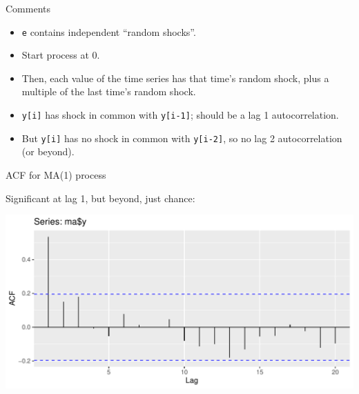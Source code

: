 \documentclass[ignorenonframetext,]{beamer}
\newenvironment{Shaded}{\begin{snugshade}}{\end{snugshade}}
\newcommand{\DataTypeTok}[1]{\textcolor[rgb]{0.13,0.29,0.53}{#1}}
\newcommand{\KeywordTok}[1]{\textcolor[rgb]{0.13,0.29,0.53}{\textbf{#1}}}
\newcommand{\NormalTok}[1]{#1}
\newcommand{\OperatorTok}[1]{\textcolor[rgb]{0.81,0.36,0.00}{\textbf{#1}}}
\newcommand{\StringTok}[1]{\textcolor[rgb]{0.31,0.60,0.02}{#1}}
\providecommand{\tightlist}{%
  \setlength{\itemsep}{0pt}\setlength{\parskip}{0pt}}
\begin{document}
\begin{frame}[fragile]{Comments}
\protect\hypertarget{comments-50}{}

\begin{itemize}
\tightlist
\item
  \texttt{e} contains independent ``random shocks''.
\item
  Start process at 0.
\item
  Then, each value of the time series has that time's random shock, plus
  a multiple of the last time's random shock.
\item
  \texttt{y{[}i{]}} has shock in common with \texttt{y{[}i-1{]}}; should
  be a lag 1 autocorrelation.
\item
  But \texttt{y{[}i{]}} has no shock in common with \texttt{y{[}i-2{]}},
  so no lag 2 autocorrelation (or beyond).
\end{itemize}

\end{frame}

\begin{frame}[fragile]{ACF for MA(1) process}
\protect\hypertarget{acf-for-ma1-process}{}

Significant at lag 1, but beyond, just chance:

\begin{Shaded}
\end{Shaded}

\includegraphics{figure/unnamed-chunk-601-1.pdf}

\end{frame}
\end{document}

